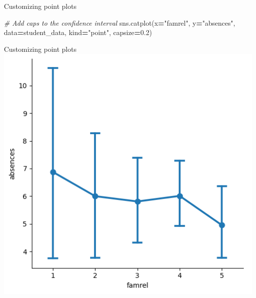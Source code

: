 \documentclass[
  ignorenonframetext,
]{beamer}
\newenvironment{Shaded}{\begin{snugshade}}{\end{snugshade}}
\newcommand{\CommentTok}[1]{\textcolor[rgb]{0.56,0.35,0.01}{\textit{#1}}}
\newcommand{\FloatTok}[1]{\textcolor[rgb]{0.00,0.00,0.81}{#1}}
\newcommand{\NormalTok}[1]{#1}
\newcommand{\OperatorTok}[1]{\textcolor[rgb]{0.81,0.36,0.00}{\textbf{#1}}}
\newcommand{\StringTok}[1]{\textcolor[rgb]{0.31,0.60,0.02}{#1}}
\begin{document}
\begin{frame}[fragile]{Customizing point plots}
\label{customizing-point-plots-6}

\begin{Shaded}
\begin{Highlighting}[]
\CommentTok{\# Add caps to the confidence interval}
\NormalTok{sns.catplot(x}\OperatorTok{=}\StringTok{"famrel"}\NormalTok{, y}\OperatorTok{=}\StringTok{"absences"}\NormalTok{,}
\NormalTok{            data}\OperatorTok{=}\NormalTok{student\_data,}
\NormalTok{            kind}\OperatorTok{=}\StringTok{"point"}\NormalTok{,}
\NormalTok{            capsize}\OperatorTok{=}\FloatTok{0.2}\NormalTok{)}
\end{Highlighting}
\end{Shaded}
\end{frame}

\begin{frame}{Customizing point plots}
\label{customizing-point-plots-7}
\includegraphics{../images/im291.png}
\end{frame}
\end{document}
